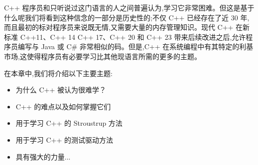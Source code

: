 C++ 程序员和只听说过这门语言的人之间普遍认为,学习它非常困难。但这是基于什么呢我们将看到这种信念的一部分是历史性的;不仅 C++ 已经存在了近 30 年,而且最初的标对程序员来说既无情,又需要大量的内存管理知识。现代 C++ 在新标准 C++11、C++ 14 C++ 17、C++ 20 和 C++ 23 带来后续改进之后,允许程序员编写与 Java 或 C\# 非常相似的码。但是,C++ 在系统编程中有其特定的利基市场,这使得程序员有必要学习比其他现语言所需的更多的主题。

在本章中,我们将介绍以下主要主题:

\begin{itemize}
\item 
为什么 C++ 被认为很难学？

\item 
C++ 的难点以及如何掌握它们

\item 
用于学习 C++ 的 Stroustrup 方法

\item 
用于学习 C++ 的测试驱动方法

\item 
具有强大的力量...
\end{itemize}



